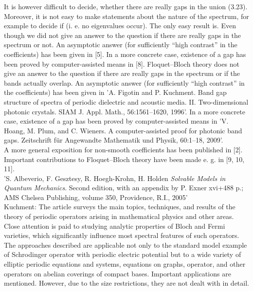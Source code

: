 It is however difficult to decide, whether there are really gaps in the union (3.23). Moreover, it is not easy to make statements about the nature of the spectrum, for example to decide if (i. e. no eigenvalues occur). The only easy result is.	 Even though we did not give an answer to the question if there are really gaps in the spectrum or not. An asymptotic answer (for sufficiently “high contrast” in the coefficients) has been given in [5]. In a more concrete case, existence of a gap has been proved by computer-assisted means in [8]. Floquet–Bloch theory does not give an answer to the question if there are really gaps in the spectrum or if the bands actually overlap. An asymptotic answer (for sufficiently “high contrast” in the coefficients) has been given in 'A. Figotin and P. Kuchment. Band gap structure of spectra of periodic dielectric and acoustic media. II. Two-dimensional photonic crystals. SIAM J. Appl. Math., 56:1561–1620, 1996'. In a more concrete case, existence of a gap has been proved by computer-assisted means in 'V. Hoang, M. Plum, and C. Wieners. A computer-assisted proof for photonic band gaps. Zeitschrift für Angewandte Mathematik und Physik, 60:1–18, 2009'.
~\\
A more general exposition for non-smooth coefficients has been published in [2]. Important contributions to Floquet–Bloch theory have been made e. g. in [9, 10, 11].	
~\\
'S. Albeverio, F. Gesztesy, R. Hoegh-Krohn, H. Holden {\it Solvable Models in Quantum Mechanics}. Second edition, with an appendix by P. Exner xvi+488 p.; AMS Chelsea Publishing, volume 350, Providence, R.I., 2005'
~\\
Kuchment: The article surveys the main topics, techniques, and results of the theory of periodic operators arising in mathematical physics and other areas. Close attention is paid to studying analytic properties of Bloch and Fermi varieties, which significantly influence most spectral features of such operators. The approaches described are applicable not only to the standard model example of Schrodinger operator with periodic electric potential but to a wide variety of elliptic periodic equations and systems, equations on graphs, operator, and other operators on abelian coverings of compact bases. Important applications are mentioned. However, due to the size restrictions, they are not dealt with in detail.
~\\
